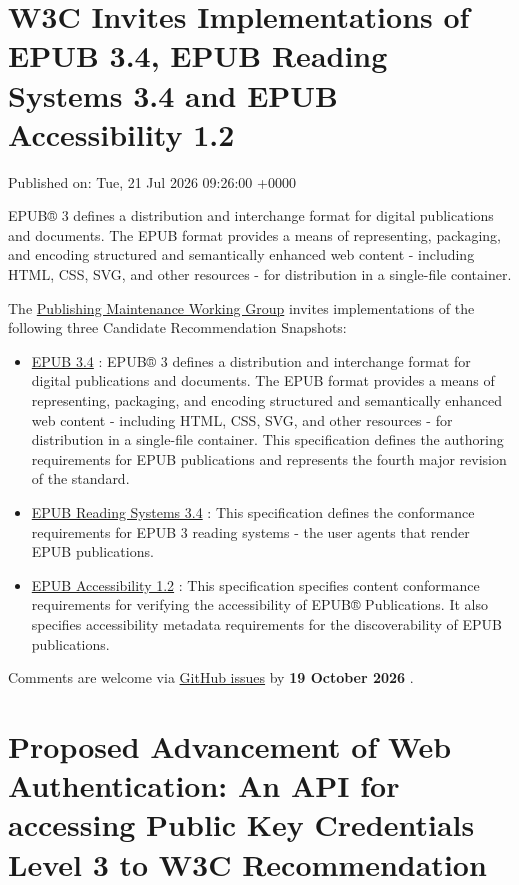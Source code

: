 \documentclass[11pt,a4paper]{article}
\begin{document}
\section{W3C Invites Implementations of EPUB 3.4, EPUB Reading Systems 3.4 and EPUB Accessibility 1.2}

Published on: Tue, 21 Jul 2026 09:26:00 +0000

EPUB® 3 defines a distribution and interchange format for digital publications and documents. The EPUB format provides a means of representing, packaging, and encoding structured and semantically enhanced web content - including HTML, CSS, SVG, and other resources - for distribution in a single-file container.

The \href{https://www.w3.org/groups/wg/pm/}{Publishing Maintenance Working Group} invites implementations of the following three Candidate Recommendation Snapshots:

\begin{itemize}
\item \href{https://www.w3.org/TR/2026/CR-epub-34-20260721/}{EPUB 3.4} : EPUB® 3 defines a distribution and interchange format for digital publications and documents. The EPUB format provides a means of representing, packaging, and encoding structured and semantically enhanced web content - including HTML, CSS, SVG, and other resources - for distribution in a single-file container. This specification defines the authoring requirements for EPUB publications and represents the fourth major revision of the standard.
\item \href{https://www.w3.org/TR/2026/CR-epub-rs-34-20260721/}{EPUB Reading Systems 3.4} : This specification defines the conformance requirements for EPUB 3 reading systems - the user agents that render EPUB publications.
\item \href{https://www.w3.org/TR/2026/CR-epub-a11y-12-20260721/}{EPUB Accessibility 1.2} : This specification specifies content conformance requirements for verifying the accessibility of EPUB® Publications. It also specifies accessibility metadata requirements for the discoverability of EPUB publications.
\end{itemize}

Comments are welcome via \href{https://github.com/w3c/epub-specs/issues/}{GitHub issues} by \textbf{19 October 2026} .

\section{Proposed Advancement of Web Authentication: An API for accessing Public Key Credentials Level 3 to W3C Recommendation}
\end{document}
